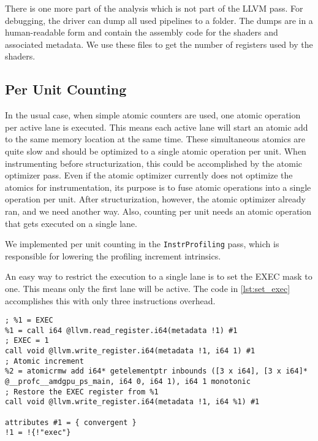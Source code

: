 There is one more part of the analysis which is not part of the LLVM pass.
For debugging, the driver can dump all used pipelines to a folder.
The dumps are in a human-readable form and contain the assembly code for the shaders and associated metadata.
We use these files to get the number of registers used by the shaders.

\subsection{Per Unit Counting}
\label{sub:impl_per_unit}
In the usual case, when simple atomic counters are used, one atomic operation per active lane is executed.
This means each active lane will start an atomic add to the same memory location at the same time.
These simultaneous atomics are quite slow and should be optimized to a single atomic operation per unit.
When instrumenting before structurization, this could be accomplished by the atomic optimizer pass.
Even if the atomic optimizer currently does not optimize the atomics for instrumentation, its purpose is to fuse atomic operations into a single operation per unit.
After structurization, however, the atomic optimizer already ran, and we need another way.
Also, counting per unit needs an atomic operation that gets executed on a single lane.

We implemented per unit counting in the \texttt{InstrProfiling} pass, which is responsible for lowering the profiling increment intrinsics.

An easy way to restrict the execution to a single lane is to set the EXEC mask to one. This means only the first lane will be active.
The code in \cref{lst:set_exec} accomplishes this with only three instructions overhead.
\begin{lstlisting}[caption={Restricting execution to a single SIMD lane},label=lst:set_exec,language={[x86masm]Assembler}]
; %1 = EXEC
%1 = call i64 @llvm.read_register.i64(metadata !1) #1
; EXEC = 1
call void @llvm.write_register.i64(metadata !1, i64 1) #1
; Atomic increment
%2 = atomicrmw add i64* getelementptr inbounds ([3 x i64], [3 x i64]* @__profc__amdgpu_ps_main, i64 0, i64 1), i64 1 monotonic
; Restore the EXEC register from %1
call void @llvm.write_register.i64(metadata !1, i64 %1) #1

attributes #1 = { convergent }
!1 = !{!"exec"}
\end{lstlisting}

